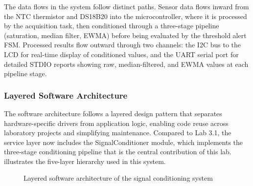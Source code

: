 The data flows in the system follow distinct paths. Sensor data flows inward from the NTC thermistor and DS18B20 into the microcontroller, where it is processed by the acquisition task, then conditioned through a three-stage pipeline (saturation, median filter, EWMA) before being evaluated by the threshold alert FSM. Processed results flow outward through two channels: the I2C bus to the LCD for real-time display of conditioned values, and the UART serial port for detailed STDIO reports showing raw, median-filtered, and EWMA values at each pipeline stage.

\subsubsection{Layered Software Architecture}

The software architecture follows a layered design pattern that separates hardware-specific drivers from application logic, enabling code reuse across laboratory projects and simplifying maintenance. Compared to Lab 3.1, the service layer now includes the SignalConditioner module, which implements the three-stage conditioning pipeline that is the central contribution of this lab.  illustrates the five-layer hierarchy used in this system.

\begin{figure}[H]
\centering
{}
\caption{Layered software architecture of the signal conditioning system}
\label{fig:layered_architecture}
\end{figure}

